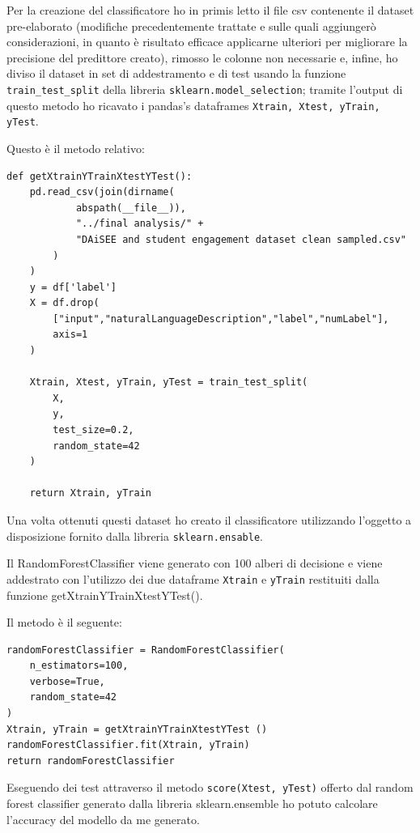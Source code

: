 Per la creazione del classificatore ho in primis letto il file csv contenente il dataset pre-elaborato (modifiche precedentemente trattate e sulle quali aggiungerò considerazioni, in quanto è risultato efficace applicarne ulteriori per migliorare la precisione del predittore creato), rimosso le colonne non necessarie e, infine, ho diviso il dataset in set di addestramento e di test usando la funzione \texttt{train_test_split} della libreria \texttt{sklearn.model_selection}; tramite l’output di questo metodo ho ricavato i pandas’s dataframes \texttt{Xtrain, Xtest, yTrain, yTest}.

Questo è il metodo relativo:
\begin{verbatim}
def getXtrainYTrainXtestYTest():
    pd.read_csv(join(dirname(
            abspath(__file__)), 
            "../final analysis/" + 
            "DAiSEE and student engagement dataset clean sampled.csv"
        )
    )
    y = df['label']
    X = df.drop(
        ["input","naturalLanguageDescription","label","numLabel"], 
        axis=1
    )
    
    Xtrain, Xtest, yTrain, yTest = train_test_split(
        X, 
        y, 
        test_size=0.2, 
        random_state=42
    )

    return Xtrain, yTrain 
\end{verbatim}
Una volta ottenuti questi dataset ho creato il classificatore utilizzando l’oggetto a disposizione fornito dalla libreria \texttt{sklearn.ensable}.

Il RandomForestClassifier viene generato con 100 alberi di decisione e viene addestrato con l’utilizzo dei due dataframe \texttt{Xtrain} e \texttt{yTrain} restituiti dalla funzione getXtrainYTrainXtestYTest().

Il metodo è il seguente:
\begin{verbatim}
randomForestClassifier = RandomForestClassifier(
    n_estimators=100, 
    verbose=True, 
    random_state=42
)
Xtrain, yTrain = getXtrainYTrainXtestYTest ()
randomForestClassifier.fit(Xtrain, yTrain)
return randomForestClassifier
\end{verbatim}

Eseguendo dei test attraverso il metodo \texttt{score(Xtest, yTest)} offerto dal random forest classifier generato dalla libreria sklearn.ensemble ho potuto calcolare l’accuracy del modello da me generato.

